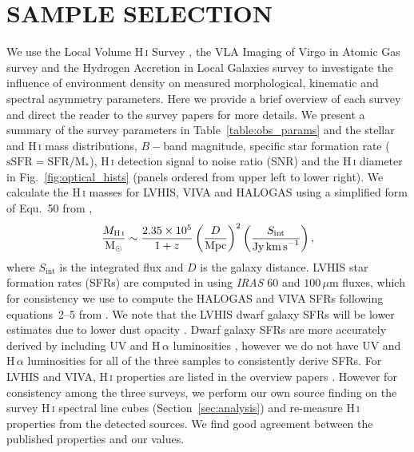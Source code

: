 \documentclass[fleqn,usenatbib]{mnras}
\begin{document}
\section{SAMPLE SELECTION}
\label{sec:data}

We use the Local Volume H\,\textsc{i} Survey \citep[LVHIS,][]{Koribalski2018}, the VLA Imaging of Virgo in Atomic Gas survey \citep[VIVA,][]{Chung2009} and the Hydrogen Accretion in Local Galaxies survey \citep[HALOGAS,][]{Heald2011} to investigate the influence of environment density on measured morphological, kinematic and spectral asymmetry parameters. Here we provide a brief overview of each survey and direct the reader to the survey papers for more details. We present a summary of the survey parameters in Table~\ref{table:obs_params} and the stellar and H\,\textsc{i} mass distributions, $B-$band magnitude, specific star formation rate ($\mathrm{sSFR}=\mathrm{SFR/M_*}$), H\,\textsc{i} detection signal to noise ratio (SNR) and the H\,\textsc{i} diameter in Fig.~\ref{fig:optical_hists} (panels ordered from upper left to lower right). We calculate the H\,\textsc{i} masses for LVHIS, VIVA and HALOGAS using a simplified form of Equ.~50 from \cite{Meyer2017},
\begin{equation}
	\displaystyle \frac{M_{\mathrm{H\,\textsc{i}}}}{\mathrm{M}_{\odot}} \sim \frac{2.35\times10^5}{1+z}\left(\frac{D}{\mathrm{Mpc}}\right)^2\left(\frac{S_{\mathrm{int}}}{\mathrm{Jy\,km\,s}^{-1}}\right),
	\label{equ:mhi}
\end{equation}
where $S_{\mathrm{int}}$ is the integrated flux and $D$ is the galaxy distance. LVHIS star formation rates (SFRs) are computed in \cite{Shao2018} using \textit{IRAS} 60 and $100\,\mu$m fluxes, which for consistency we use to compute the HALOGAS and VIVA SFRs following equations~2--5 from \cite{Kewley2002}. We note that the LVHIS dwarf galaxy SFRs will be lower estimates due to lower dust opacity \citep[e.g.][]{Shao2018}. Dwarf galaxy SFRs are more accurately derived by including UV and H\,$\alpha$ luminosities \citep[e.g.][and references therein]{Cluver2017}, however we do not have UV and H\,$\alpha$ luminosities for all of the three samples to consistently derive SFRs. For LVHIS and VIVA, H\,\textsc{i} properties are listed in the overview papers \citep[][respectively]{Koribalski2018,Chung2009}. However for consistency among the three surveys, we perform our own source finding on the survey H\,\textsc{i} spectral line cubes (Section~\ref{sec:analysis}) and re-measure H\,\textsc{i} properties from the detected sources. We find good agreement between the published properties and our values.
\end{document}
